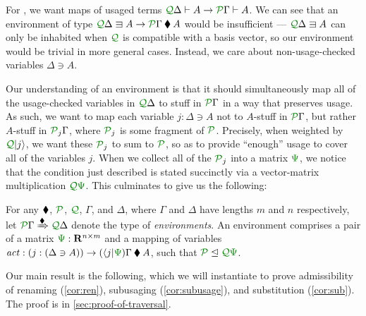 \documentclass[submission,copyright,creativecommons]{eptcs}
\begin{document}
For \name{}, we want maps of usaged terms
$\ctx{\Delta}{Q} \vdash A \to \ctx{\Gamma}{P} \vdash A$.
We can see that an environment of type
$\ctx{\Delta}{Q} \lvar A \to \ctx{\Gamma}{P} \kitrel A$ would
be insufficient --- $\ctx{\Delta}{Q} \lvar A$ can only be inhabited when
$\resctx Q$ is compatible with a basis vector, so our environment would be
trivial in more general cases.
Instead, we care about non-usage-checked variables $\Delta \ni A$.

Our understanding of an environment is that it should simultaneously
map all of the usage-checked variables in $\ctx{\Delta}{Q}$ to stuff
in $\ctx{\Gamma}{P}$ in a way that preserves usage.  As such, we want
to map each variable $j : \Delta \ni A$ not to $A$-stuff in
$\ctx{\Gamma}{P}$, but rather $A$-stuff in $\resctx P_j\Gamma$, where
$\resctx P_j$ is some fragment of $\resctx P$.  Precisely, when
weighted by $\resctx Q\lvert j \rangle$, we want these $\resctx P_j$
to sum to $\resctx P$, so as to provide ``enough'' usage to cover all
of the variables $j$.  When we collect all of the $\resctx P_j$ into a
matrix $\rescomment\Psi$, we notice that the condition just described
is stated succinctly via a vector-matrix multiplication
$\resctx Q\rescomment\Psi$. This culminates to give us the following:

\begin{definition}\label{def:env}
  For any $\mathbin{\blacklozenge}$, $\resctx P$, $\resctx Q$, $\Gamma$, and $\Delta$,
  where $\Gamma$ and $\Delta$ have lengths $m$ and $n$ respectively,
  let $\ctx{\Gamma}{P} \subst{\kitrel} \ctx{\Delta}{Q}$ denote the
  type of \emph{environments}.  An environment comprises a pair of a
  matrix $\rescomment\Psi : \mathbf R^{n \times m}$ and a mapping of
  variables
  $\mathit{act} : (j : (\Delta \ni A)) \to (\langle j
  \rvert\rescomment\Psi)\Gamma \kitrel A$, such that
  $\resctx P \subres \resctx Q \rescomment\Psi$.
\end{definition}

Our main result is the following, which we will instantiate to prove
admissibility of renaming (\autoref{cor:ren}), subusaging
(\autoref{cor:subusage}), and substitution (\autoref{cor:sub}). The
proof is in \autoref{sec:proof-of-traversal}.
\end{document}
